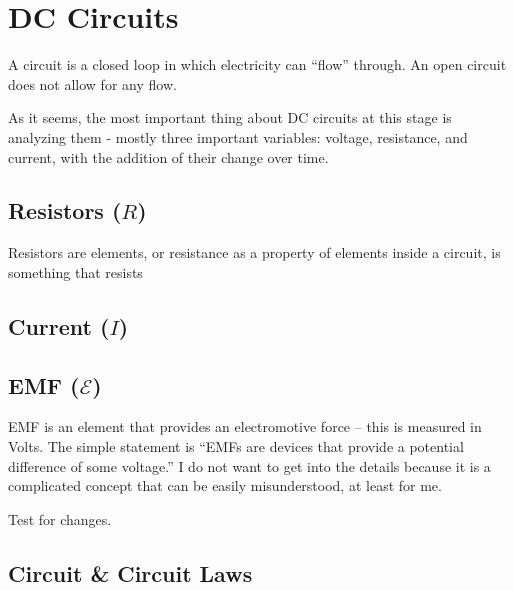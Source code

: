 \chapter{DC Circuits}

A circuit is a closed loop in which electricity can ``flow'' through. An open circuit does not allow for any flow.

As it seems, the most important thing about DC circuits at this stage is analyzing them - mostly three important variables: voltage, resistance, and current, with the addition of their change over time.

\section{Resistors (\texorpdfstring{$R$}{R})}

Resistors are elements, or resistance as a property of elements inside a circuit, is something that resists 

\section{Current (\texorpdfstring{$I$}{I})}

\section{EMF (\texorpdfstring{$\mathcal{E}$}{E})}

EMF is an element that provides an electromotive force -- this is measured in Volts. The simple statement is ``EMFs are devices that provide a potential difference of some voltage.'' I do not want to get into the details because it is a complicated concept that can be easily misunderstood, at least for me.

Test for changes.

\section{Circuit \& Circuit Laws}